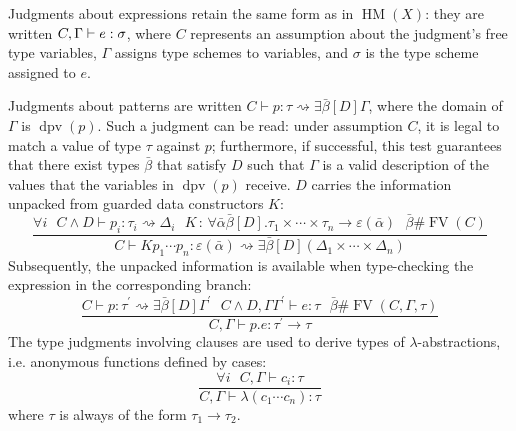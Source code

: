 \documentclass{article}
\newcommand{\colons}{\,:\,}
\newcommand{\tmop}[1]{\ensuremath{\operatorname{#1}}}
\begin{document}
Judgments about expressions retain the same form as in $\tmop{HM} (X)$: they
are written $C, {\nobreak} \Gamma \vdash e : \sigma$, where $C$ represents an
assumption about the judgment's free type variables, $\Gamma$ assigns type
schemes to variables, and $\sigma$ is the type scheme assigned to $e$.

Judgments about patterns are written $C \vdash p : \tau \rightsquigarrow
\exists \bar{\beta} [D] \Gamma$, where the domain of $\Gamma$ is $\tmop{dpv}
(p)$. Such a judgment can be read: under assumption $C$, it is legal to match
a value of type $\tau$ against $p$; furthermore, if successful, this test
guarantees that there exist types $\bar{\beta}$ that satisfy $D$ such that
$\Gamma$ is a valid description of the values that the variables in
$\tmop{dpv} (p)$ receive. $D$ carries the information unpacked from guarded
data constructors $K$:
\[ \frac{\forall i \text{ \ \ } C \wedge D \vdash p_i : \tau_i
   \rightsquigarrow \Delta_i \text{ \ \ \ } K \colons \forall \bar{\alpha}
   \bar{\beta} [D] . \tau_1 \times \cdots \times \tau_n \rightarrow
   \varepsilon (\bar{\alpha}) \text{ \ \ \ } \bar{\beta} \# \tmop{FV} (C)}{C
   \vdash K p_1 \cdots p_n : \varepsilon (\bar{\alpha}) \rightsquigarrow
   \exists \bar{\beta} [D] (\Delta_1 \times \cdots \times \Delta_n)} \]
Subsequently, the unpacked information is available when type-checking the
expression in the corresponding branch:
\begin{equation}
  \frac{C \vdash p : \tau^{\prime} \rightsquigarrow \exists \bar{\beta} [D]
  \Gamma^{\prime} \text{ \ \ \ } C \wedge D, \Gamma \Gamma^{\prime} \vdash e :
  \tau \text{ \ \ \ } \bar{\beta} \# \tmop{FV} (C, \Gamma, \tau)}{C, \Gamma
  \vdash p.e : \tau^{\prime} \rightarrow \tau} \label{HMGClauseRule}
\end{equation}
The type judgments involving clauses are used to derive types of
$\lambda$-abstractions, i.e. anonymous functions defined by cases:
\[ \frac{\forall i \text{ \ \ } C, \Gamma \vdash c_i : \tau}{C, \Gamma \vdash
   \lambda (c_1 \cdots c_n) : \tau} \]
where $\tau$ is always of the form $\tau_1 \rightarrow \tau_2$.
\end{document}
